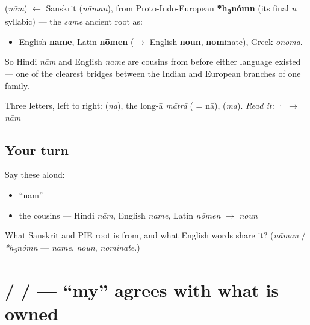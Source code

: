 \begin{cousinweb}
\textbf{} (\emph{nām}) $\leftarrow$ Sanskrit \textbf{} (\emph{nāman}), from Proto-Indo-European \textbf{*h\textsubscript{3}nómn} (its final \emph{n} syllabic) — the \emph{same} ancient root as:

\begin{itemize}
\raggedright
  \item English \textbf{name}, Latin \textbf{nōmen} ($\to$ English \textbf{noun}, \textbf{nom}inate), Greek \emph{onoma}.
\end{itemize}

So Hindi \emph{nām} and English \emph{name} are cousins from before either language existed — one of the clearest bridges between the Indian and European branches of one family.
\end{cousinweb}

\begin{sounds}
Three letters, left to right:  (\emph{na}),  the long-ā \emph{mātrā} ( = nā),  (\emph{ma}). \emph{Read it:} · $\to$ \emph{nām}
\end{sounds}

\subsection*{Your turn}
Say these aloud:

\begin{itemize}
\raggedright
  \item \textquotedblleft{}nām\textquotedblright{}
  \item the cousins — Hindi \emph{nām}, English \emph{name}, Latin \emph{nōmen} $\to$ \emph{noun}
\end{itemize}

\begin{tcolorbox}[breakable,colback=teal!4,colframe=teal!35!black,title={Before you move on}]
What Sanskrit and PIE root is \textbf{} from, and what English words share it? (\emph{nāman} / \emph{*h\textsubscript{3}nómn} — \emph{name}, \emph{noun}, \emph{nominate}.)
\end{tcolorbox}
\section[\texorpdfstring{\hi{मेरा} / \hi{मेरी} / \hi{मेरे} (merā / merī / mere)}{मेरा / मेरी / मेरे (merā / merī / mere)}]{ /  /  — \textquotedblleft{}my\textquotedblright{} agrees with what is owned}

